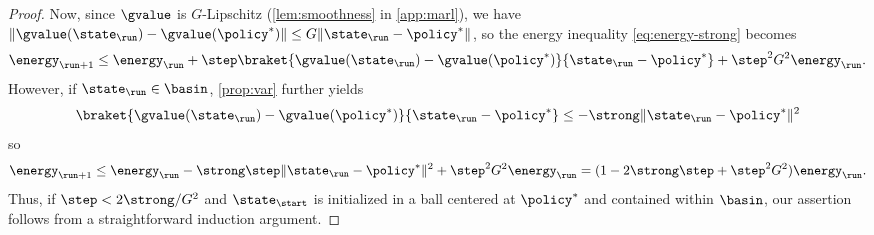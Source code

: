 \begin{proof}
Now, since $\gvalue$ is $G$-Lipschitz (\cf \cref{lem:smoothness} in \cref{app:marl}), we have $\norm{\gvalue(\curr) - \gvalue(\eq)} \leq G \norm{\curr - \eq}$, so the energy inequality \eqref{eq:energy-strong} becomes
\begin{equation}
\next[\energy]
	\leq \curr[\energy]
		+ \step \braket{\gvalue(\curr) - \gvalue(\eq)}{\curr - \eq}
		+ \step^{2} G^{2} \curr[\energy].
\end{equation}
However, if $\curr \in \basin$, \cref{prop:var} further yields
\begin{equation}
\braket{\gvalue(\curr) - \gvalue(\eq)}{\curr - \eq}
	\leq - \strong \norm{\curr - \eq}^{2}
\end{equation}
so
\begin{equation}
\next[\energy]
	\leq \curr[\energy]
		- \strong\step \norm{\curr - \eq}^{2}
		+ \step^{2} G^{2} \curr[\energy]
	= (1 - 2\strong\step + \step^{2}G^{2}) \curr[\energy].
\end{equation}
Thus, if $\step < 2\strong/G^{2}$ and $\init$ is initialized in a ball centered at $\eq$ and contained within $\basin$, our assertion follows from a straightforward induction argument.
\end{proof}